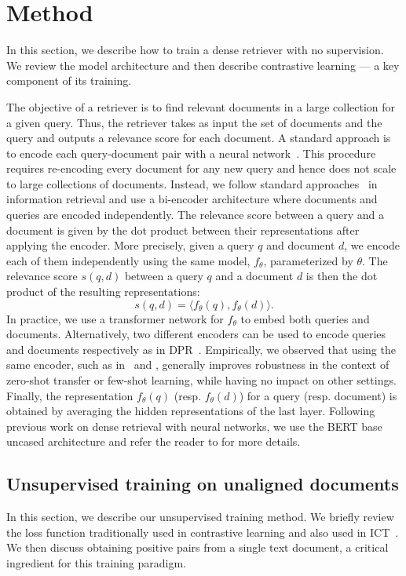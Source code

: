 \documentclass[10pt]{article} %
\begin{document}
\section{Method}

In this section, we describe how to train a dense retriever with no supervision.
We review the model architecture and then describe contrastive learning --- a key component of its training.

The objective of a retriever is to find relevant documents in a large collection for a given query.
Thus, the retriever takes as input the set of documents and the query and outputs a relevance score for each document.
A standard approach is to encode each query-document pair with a neural network~\citep{nogueira2019passage}.
This procedure requires re-encoding every document for any new query and hence does not scale to large collections of documents.
Instead, we follow standard approaches~\citep{huang2013learning,karpukhin2020dense} in information retrieval and use a bi-encoder architecture where documents and queries are encoded independently.
The relevance score between a query and a document is given by the dot product between their representations after applying the encoder.
More precisely, given a query $q$ and document $d$, we encode each of them independently using the same model, $f_\theta$, parameterized by $\theta$.
The relevance score $s(q, d)$ between a query $q$ and a document $d$ is then the dot product of the resulting representations:
$$s(q,d) = \langle f_\theta(q), f_\theta(d)\rangle.$$
In practice, we use a transformer network for $f_{\theta}$ to embed both queries and documents.
Alternatively, two different encoders can be used to encode queries and documents respectively as in DPR~\citep{karpukhin2020dense}.
Empirically, we observed that using the same encoder, such as in~\citet{xiong2020approximate} and \citet{reimers2019sentence}, generally improves robustness in the context of zero-shot transfer or few-shot learning, while having no impact on other settings.
Finally, the representation $f_\theta(q)$ (resp. $f_\theta(d)$) for a query (resp. document) is obtained by averaging the hidden representations of the last layer.
Following previous work on dense retrieval with neural networks, we use the BERT base uncased architecture and refer the reader to \citet{devlin2018bert} for more details.


\subsection{Unsupervised training on unaligned documents}
In this section, we describe our unsupervised training method.
We briefly review the loss function traditionally used in contrastive learning and also used in ICT~\citep{lee2019latent}.
We then discuss obtaining positive pairs from a single text document, a critical ingredient for this training paradigm.
\end{document}
